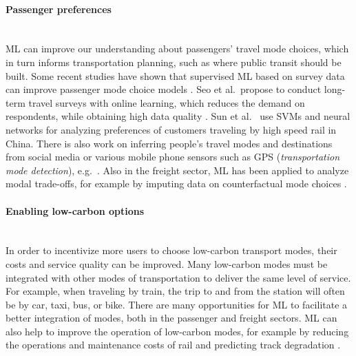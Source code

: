 \documentclass[11pt]{report}
\newcommand{\et}{et al.~}
\newcommand{\Gap}{\texorpdfstring{\hfill}{}}
\newcommand{\Rec}{\texorpdfstring{{\small\emph{\color{blue}{\fbox{High Leverage}}}}}{}}
\begin{document}
\paragraph*{Passenger preferences }\Gap\mbox{}\\ML can improve our understanding about passengers' travel mode choices, which in turn informs transportation planning, such as where public transit should be built. 
Some recent studies have shown that supervised ML based on survey data can improve passenger mode choice models \cite{omrani2015predicting, nam2017model, HAGENAUER2017273}. 
Seo \et propose to conduct long-term travel surveys with online learning, which reduces the demand on respondents, while obtaining high data quality \cite{SEO2017}. 
Sun \et \cite{SUN201896} use SVMs and neural networks for analyzing preferences of customers traveling by high speed rail in China. 
There is also work on inferring people's travel modes and destinations from social media or various mobile phone sensors such as GPS (\emph{transportation mode detection}), e.g.~\cite{DABIRI2018360, doi:10.1080/13658816.2017.1356464}.  Also in the freight sector, ML has been applied to analyze modal trade-offs, for example by imputing data on counterfactual mode choices \cite{doi:10.1080/03081060.2011.600092}.

\paragraph*{Enabling low-carbon options}\Gap\textbf{\Rec}\label{sec:LCcompetitive}\mbox{}\\In order to incentivize more users to choose low-carbon transport modes, their costs and service quality can be improved.
Many low-carbon modes must be integrated with other modes of transportation to deliver the same level of service. For example, when traveling by train, the trip to and from the station will often be by car, taxi, bus, or bike. There are many opportunities for ML to facilitate a better integration of modes, both in the passenger and freight sectors.
ML can also help to improve the operation of 
low-carbon modes, for example by reducing the operations and maintenance costs of rail \cite{JAMSHIDI2018185} and predicting track degradation \cite{doi:10.1177/0954409716657849}. 
\end{document}

